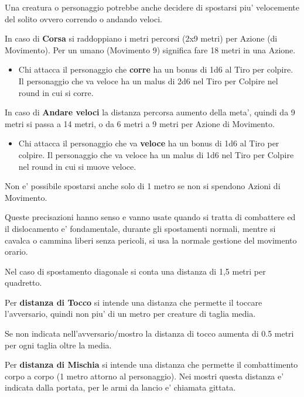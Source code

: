 \documentclass[a4paper,11pt,twoside,openany]{book}
\begin{document}
	Una creatura o personaggio potrebbe anche decidere di spostarsi piu' velocemente del solito ovvero correndo o andando veloci.
	
	In caso di \textbf{Corsa} si raddoppiano i metri percorsi (2x9 metri) per Azione (di Movimento). Per un umano (Movimento 9) significa fare 18 metri in una Azione.
	
	\begin{itemize}
		\item Chi attacca il personaggio che \textbf{corre} ha un bonus di 1d6 al Tiro per colpire. Il personaggio che va veloce ha un malus di 2d6 nel Tiro per Colpire nel round in cui si corre.
	\end{itemize}
	
	In caso di \textbf{Andare veloci} la distanza percorsa aumento della meta', quindi da 9 metri si passa a 14 metri, o da 6 metri a 9 metri per Azione di Movimento.
	
	\begin{itemize}
		\item Chi attacca il personaggio che va \textbf{veloce} ha un bonus di 1d6 al Tiro per colpire. Il personaggio che va veloce ha un malus di 1d6 nel Tiro per Colpire nel round in cui si muove veloce.
	\end{itemize}
	
	Non e' possibile spostarsi anche solo di 1 metro se non si spendono Azioni di Movimento.
	
	Queste precisazioni hanno senso e vanno usate quando si tratta di combattere ed il dislocamento e' fondamentale, durante gli spostamenti normali, mentre si cavalca o cammina liberi senza pericoli, si usa la normale gestione del movimento orario.
	
	Nel caso di spostamento diagonale si conta una distanza di 1,5 metri per quadretto.
	
	Per \textbf{distanza di Tocco}  si intende una distanza che permette il toccare l'avversario, quindi non piu' di un metro per creature di taglia media.
	
	Se non indicata nell'avversario/mostro la distanza di tocco aumenta di 0.5 metri per ogni taglia oltre la media.
	
	Per \textbf{distanza di Mischia}  si intende una distanza che permette il combattimento corpo a corpo (1 metro attorno al personaggio). Nei mostri questa distanza e' indicata dalla portata, per le armi da lancio e' chiamata gittata.
	
\end{document}
